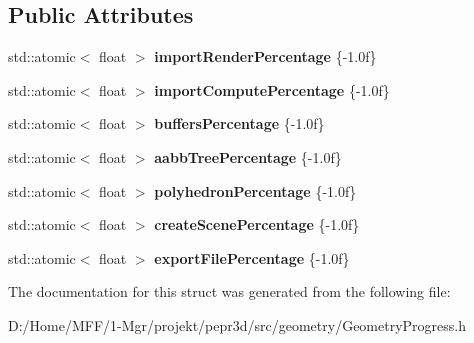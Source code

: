\subsection*{Public Attributes}
\begin{DoxyCompactItemize}
\item 
\mbox{\label{structpepr3d_1_1_geometry_progress_a8c0d575de2c03359bc4e003dda1dcb0d}} 
std\+::atomic$<$ float $>$ {\bfseries import\+Render\+Percentage} \{-\/1.\+0f\}
\item 
\mbox{\label{structpepr3d_1_1_geometry_progress_a65d7951c07a721ef6f5db6df74a15bba}} 
std\+::atomic$<$ float $>$ {\bfseries import\+Compute\+Percentage} \{-\/1.\+0f\}
\item 
\mbox{\label{structpepr3d_1_1_geometry_progress_a6b47ccbd1d8ec7d551579d19a2cf99de}} 
std\+::atomic$<$ float $>$ {\bfseries buffers\+Percentage} \{-\/1.\+0f\}
\item 
\mbox{\label{structpepr3d_1_1_geometry_progress_add7138f9550b00a8c5e67b6b68affc8a}} 
std\+::atomic$<$ float $>$ {\bfseries aabb\+Tree\+Percentage} \{-\/1.\+0f\}
\item 
\mbox{\label{structpepr3d_1_1_geometry_progress_af854f0a26bb66e3ffdb71efae415a5ec}} 
std\+::atomic$<$ float $>$ {\bfseries polyhedron\+Percentage} \{-\/1.\+0f\}
\item 
\mbox{\label{structpepr3d_1_1_geometry_progress_ab9c88b44511633f051fea6616a34e4f5}} 
std\+::atomic$<$ float $>$ {\bfseries create\+Scene\+Percentage} \{-\/1.\+0f\}
\item 
\mbox{\label{structpepr3d_1_1_geometry_progress_af0505fdb14dae3cdadd49ce5aa70516e}} 
std\+::atomic$<$ float $>$ {\bfseries export\+File\+Percentage} \{-\/1.\+0f\}
\end{DoxyCompactItemize}


The documentation for this struct was generated from the following file\+:\begin{DoxyCompactItemize}
\item 
D\+:/\+Home/\+M\+F\+F/1-\/\+Mgr/projekt/pepr3d/src/geometry/Geometry\+Progress.\+h\end{DoxyCompactItemize}
